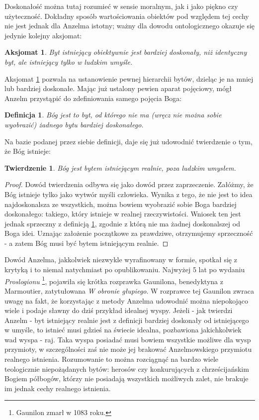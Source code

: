 \documentclass{article}
\newtheorem{theorem}{Twierdzenie}
\newtheorem{definition}{Definicja}
\newtheorem{axiom}{Aksjomat}
\begin{document}
Doskonałość można tutaj rozumieć w sensie moralnym, jak i jako piękno czy użyteczność. Dokładny sposób wartościowania obiektów pod względem tej cechy nie jest jednak dla Anzelma istotny; ważny dla dowodu ontologicznego okazuje się jedynie kolejny aksjomat:

\begin{axiom} \label{axiom:2}
	Byt istniejący obiektywnie jest bardziej doskonały, niż identyczny byt, ale istniejący tylko w ludzkim umyśle. 
\end{axiom}

Aksjomat \ref{axiom:2} pozwala na ustanowienie pewnej hierarchii bytów, dzieląc je na mniej lub bardziej doskonałe. Mając już ustalony pewien aparat pojęciowy, mógł Anzelm przystąpić do zdefiniowania samego pojęcia Boga:

\begin{definition} \label{def:god}
	Bóg jest to byt, od którego nie ma (wręcz nie można sobie wyobrazić) żadnego bytu bardziej doskonałego. 
\end{definition}

Na bazie podanej przez siebie definicji, daje się już udowodnić twierdzenie o tym, że Bóg istnieje:

\begin{theorem} \label{theorem:god}
	Bóg jest bytem istniejącym realnie, poza ludzkim umysłem. 
\end{theorem}

\begin{proof}
	Dowód twierdzenia odbywa się jako dowód przez zaprzeczenie. Załóżmy, że Bóg istnieje tylko jako wytwór myśli człowieka. Wynika z tego, że nie jest to idea najdoskonalsza ze wszystkich, można bowiem wyobrazić sobie Boga bardziej doskonałego: takiego, który istnieje w realnej rzeczywistości. Wniosek ten jest jednak sprzeczny z definicją \ref{def:god}, zgodnie z którą nie ma żadnej doskonalszej od Boga idei. Uznając założenie początkowe za prawdziwe, otrzymujemy sprzeczność - a zatem Bóg musi być bytem istniejącym realnie. 
\end{proof}
	
Dowód Anzelma, jakkolwiek niezwykle wyrafinowany w formie, spotkał się z krytyką i to niemal natychmiast po opublikowaniu. Najwyżej 5 lat po wydaniu \emph{Proslogionu} \footnote{Gaunilon zmarł w 1083 roku.}, pojawiła się krótka rozprawka Gaunilona, benedyktyna z Marmoutier, zatytułowana \emph{W obronie głupiego}. W rozprawce tej Gaunilon zwraca uwagę na fakt, że korzystając z metody Anzelma udowodnić można niepokojąco wiele i podaje sławny do dziś przykład idealnej wyspy. Jeżeli - jak twierdzi Anzelm - byt istniejący realnie jest z definicji bardziej doskonały od istniejącego w umyśle, to istnieć musi gdzieś na świecie idealna, pozbawiona jakichkolwiek wad wyspa - raj. Taka wyspa posiadać musi bowiem wszystkie możliwe dla wysp przymioty, w szczególności zaś nie może jej brakować Anzelmowskiego przymiotu realnego istnienia. Rozumowanie to można rozciągnąć na bardzo wiele teologicznie niepożądanych bytów: herosów czy konkurujących z chrześcijańskim Bogiem półbogów, którzy nie posiadają wszystkich możliwych zalet, nie brakuje im jednak cechy realnego istnienia. 
\end{document}
